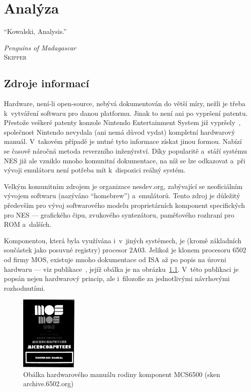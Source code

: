 \chapter{Analýza}
\epigraph{
	\enquote{Kowalski, Analysis.}
}{\textit{Penguins of Madagascar}\\ \textsc{Skipper}}

\section{Zdroje informací}
Hardware, není-li open-source, nebývá dokumentován do větší míry, nežli je třeba k~vytváření softwaru pro danou platformu. Jinak to není ani po vypršení patentu. Přestože veškeré patenty konzole Nintendo Entertainment System již vypršely~\cite{Nesdev:patents}, společnost Nintendo nevydala (ani nemá důvod vydat) kompletní hardwarový manuál. V~takovém případě je nutné tyto informace získat jinou formou. Nabízí se časově náročná metoda reverzního inženýrství. Díky popularitě a~stáří systému NES již ale vzniklo mnoho komunitní dokumentace, na níž se lze odkazovat a~při vývoji emulátoru není potřeba mít k~dispozici reálný systém.

Velkým komunitním zdrojem je organizace nesdev.org, zabývající se neoficiálním vývojem softwaru (nazýváno \enquote{homebrew}) a~emulátorů. Tento zdroj je důležitý především pro vývoj softwarového modelu proprietárních komponent specifických pro NES --- grafického čipu, zvukového syntezátoru, paměťového rozhraní pro ROM a~dalších.

Komponentou, která byla využívána i~v~jiných systémech, je (kromě základních součástek jako posuvné registry) procesor 2A03. Jelikož je klonem procesoru 6502 od firmy MOS, existuje mnoho dokumentace od ISA až po popis na úrovni hardwaru --- viz publikace~\cite{mos:hw-manual}, jejíž obálka je na obrázku~\ref{fig:mos-hw-manual}. V~této publikaci je popsán nejen hardwarový princip, ale i~filozofie za jednotlivými návrhovými rozhodnutími.

\begin{figure}[ht!]
	\centering
	\caption{Obálka hardwarového manuálu rodiny komponent MCS6500 (sken archive.6502.org)}
	\label{fig:mos-hw-manual}
	\includegraphics[width=0.25\textwidth]{images/mos-hw-manual.png}
\end{figure}

